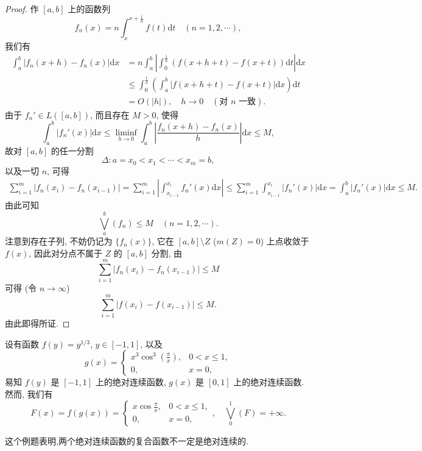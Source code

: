 \documentclass[../../main.tex]{subfiles}%
\begin{document}
\begin{proof}

作 $[a,b]$ 上的函数列
\[
f_n(x) = n\int_x^{x+\frac{1}{n}} f(t)\mathrm{d}t\quad (n=1,2,\cdots),
\]
我们有
\begin{align*}
\int_a^b |f_n(x+h)-f_n(x)|\mathrm{d}x
&= n\int_a^b \left|\int_0^{\frac{1}{n}} (f(x+h+t)-f(x+t))\mathrm{d}t\right|\mathrm{d}x \\
&\leqslant \int_0^{\frac{1}{n}} \left(\int_a^b |f(x+h+t)-f(x+t)|\mathrm{d}x\right)\mathrm{d}t \\
&= O(|h|),\quad h\to 0 \quad (\text{对 } n \text{ 一致}).
\end{align*}
由于 $f_n'\in L([a,b])$, 而且存在 $M>0$, 使得
\[
\int_a^b |f_n'(x)|\mathrm{d}x \leqslant \liminf_{h\to 0} \int_a^b \left|\frac{f_n(x+h)-f_n(x)}{h}\right|\mathrm{d}x \leqslant M,
\]
故对 $[a,b]$ 的任一分割
\[
\Delta: a = x_0 < x_1 < \cdots < x_m = b,
\]
以及一切 $n$, 可得
\begin{align*}
\sum_{i=1}^m |f_n(x_i)-f_n(x_{i-1})| = \sum_{i=1}^m \left|\int_{x_{i-1}}^{x_i} f_n'(x)\mathrm{d}x\right| 
\leqslant \sum_{i=1}^m \int_{x_{i-1}}^{x_i} |f_n'(x)|\mathrm{d}x = \int_a^b |f_n'(x)|\mathrm{d}x \leqslant M.
\end{align*}
由此可知
\[
\bigvee_a^b(f_n) \leqslant M\quad (n=1,2,\cdots).
\]
注意到存在子列, 不妨仍记为 $\{f_n(x)\}$, 它在 $[a,b]\setminus Z$ ($m(Z)=0$) 上点收敛于 $f(x)$, 因此对分点不属于 $Z$ 的 $[a,b]$ 分割, 由
\[
\sum_{i=1}^m |f_n(x_i)-f_n(x_{i-1})| \leqslant M
\]
可得 (令 $n\to\infty$)
\[
\sum_{i=1}^m |f(x_i)-f(x_{i-1})| \leqslant M.
\]
由此即得所证.

\end{proof}

\begin{example}
设有函数 $f(y)=y^{1/3}$, $y\in[-1,1]$, 以及
\[
g(x) =
\begin{cases}
x^3\cos^3(\frac{\pi}{x}), & 0<x\leqslant 1, \\
0, & x=0,
\end{cases}
\]
易知 $f(y)$ 是 $[-1,1]$ 上的绝对连续函数, $g(x)$ 是 $[0,1]$ 上的绝对连续函数. 然而, 我们有
\[
F(x) = f(g(x)) =
\begin{cases}
x\cos\frac{\pi}{x}, & 0<x\leqslant 1, \\
0, & x=0,
\end{cases},
\quad \bigvee_0^1(F) = +\infty.
\]
\end{example}
\begin{remark}
这个例题表明,两个绝对连续函数的复合函数不一定是绝对连续的.
\end{remark} 
\end{document}
